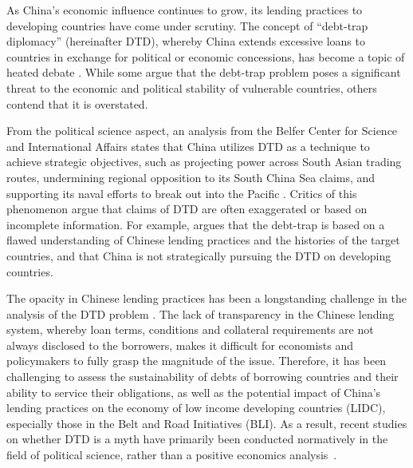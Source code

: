 As China's economic influence continues to grow, its lending practices to developing countries have come under scrutiny.
The concept of ``debt-trap diplomacy'' (hereinafter DTD), whereby China extends excessive loans to countries in exchange for political or economic concessions, has become a topic of heated debate \citep{Chellaney_2017}.
While some argue that the debt-trap problem poses a significant threat to the economic and political stability of vulnerable countries, others contend that it is overstated.

From the political science aspect, an analysis from the Belfer Center for Science and International Affairs states that China utilizes DTD as a technique to achieve strategic objectives, such as projecting power across South Asian trading routes, undermining regional opposition to its South China Sea claims, and supporting its naval efforts to break out into the Pacific \citep*{Parker2018}.
Critics of this phenomenon argue that claims of DTD are often exaggerated or based on incomplete information. For example, \citet*{Brautigam-meme-2020} argues that the debt-trap is based on a flawed understanding of Chinese lending practices and the histories of the target countries, and that China is not strategically pursuing the DTD on developing countries.

The opacity in Chinese lending practices has been a longstanding challenge in the analysis of the DTD problem \citep*{Horn-Reinhart-Trebesch-21}.
The lack of transparency in the Chinese lending system, whereby loan terms, conditions and collateral requirements are not always disclosed to the borrowers, makes it difficult for economists and policymakers to fully grasp the magnitude of the issue.
Therefore, it has been challenging to assess the sustainability of debts of borrowing countries and their ability to service their obligations, as well as the potential impact of China's lending practices on the economy of low income developing countries (LIDC), especially those in the Belt and Road Initiatives (BLI).
As a result, recent studies on whether DTD is a myth have primarily been conducted normatively in the field of political science, rather than a positive economics analysis~\citep[See, e.g.,][]{Himmer2023-vn,Chen2020-eo}.

